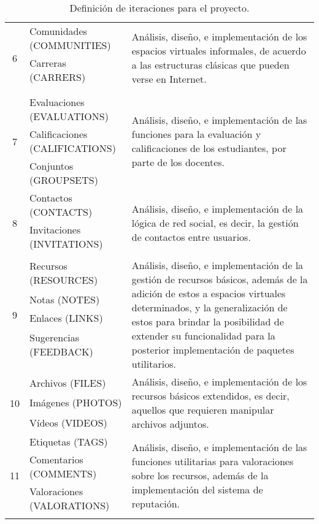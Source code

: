 \begin{table}
\begin{tabular}{|c|l|p{8.0cm}|}
\multirow{4}{*}{6} &
Comunidades (COMMUNITIES) &
\multirow{4}{8cm}{Análisis, diseño, e implementación de los espacios virtuales
informales, de acuerdo a las estructuras clásicas que pueden verse en Internet.}
\\
 & Carreras (CARRERS) & \\
 & & \\
 & & \\
\hline

\multirow{3}{*}{7} &
Evaluaciones (EVALUATIONS) &
\multirow{3}{8cm}{Análisis, diseño, e implementación de las funciones para la
evaluación y calificaciones de los estudiantes, por parte de los docentes.} \\
 & Calificaciones (CALIFICATIONS) & \\
 & Conjuntos (GROUPSETS) & \\
\hline

\multirow{3}{*}{8} &
Contactos (CONTACTS) &
\multirow{3}{8cm}{Análisis, diseño, e implementación de la lógica de red social,
es decir, la gestión de contactos entre usuarios.} \\
 & Invitaciones (INVITATIONS) & \\
 & & \\
\hline

\multirow{7}{*}{9} &
Recursos (RESOURCES) &
\multirow{7}{8cm}{Análisis, diseño, e implementación de la gestión de recursos
básicos, además de la adición de estos a espacios virtuales determinados, y la
generalización de estos para brindar la posibilidad de extender su funcionalidad
para la posterior implementación de paquetes utilitarios.} \\
 & Notas (NOTES) & \\
 & Enlaces (LINKS) & \\
 & Sugerencias (FEEDBACK) & \\
 & & \\
 & & \\
 & & \\
\hline

\multirow{3}{*}{10} &
Archivos (FILES) &
\multirow{3}{8cm}{Análisis, diseño, e implementación de los recursos básicos
extendidos, es decir, aquellos que requieren manipular archivos adjuntos.} \\
 & Imágenes (PHOTOS) & \\
 & Vídeos (VIDEOS) & \\
\hline

\multirow{4}{*}{11} &
Etiquetas (TAGS) &
\multirow{4}{8cm}{Análisis, diseño, e implementación de las funciones
utilitarias para valoraciones sobre los recursos, además de la implementación
del sistema de reputación.} \\
 & Comentarios (COMMENTS) & \\
 & Valoraciones (VALORATIONS) & \\
 & & \\
\hline
\end{tabular}
\caption{Definición de iteraciones para el proyecto.}
\label{iteraciones}
\end{table}

